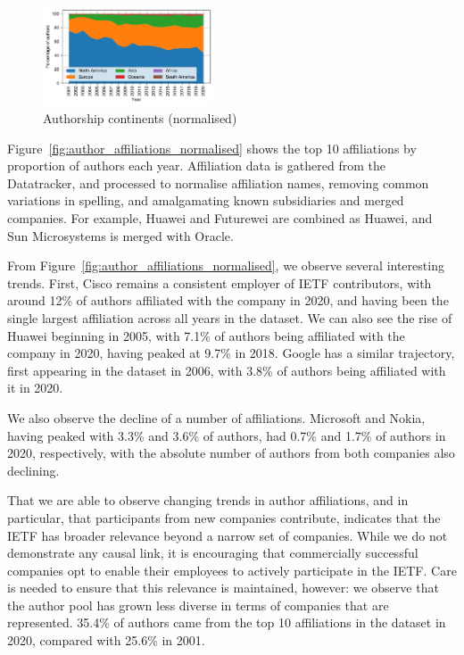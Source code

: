 \documentclass[twocolumn,10pt]{article}
\newcommand{\pb}[1]{\vspace{0.75ex}\noindent{\textbf{#1}}}
\begin{document}
\begin{figure}
\includegraphics[width=0.45\textwidth]{figures-prev/imc-2021/authors/continents_normalised.pdf}
\caption{Authorship continents (normalised)}
\label{fig:author_continents_normalised}
\end{figure}

\pb{Author Affiliations:}
Figure~\ref{fig:author_affiliations_normalised} shows the top 10
affiliations by proportion of authors each year. Affiliation data is
gathered from the Datatracker, and processed to normalise affiliation
names, removing common variations in spelling, and amalgamating known
subsidiaries and merged companies. For example, Huawei and Futurewei are
combined as Huawei, and Sun Microsystems is merged with Oracle.

From Figure~\ref{fig:author_affiliations_normalised}, we observe several
interesting trends.  First, Cisco remains a consistent employer of IETF
contributors, with around 12\% of authors affiliated with the company in
2020, and having been the single largest affiliation across all years in
the dataset. We can also see the rise of Huawei beginning in 2005, with
7.1\% of authors being affiliated with the company in 2020, having peaked
at 9.7\% in 2018. Google has a similar trajectory, first appearing in the
dataset in 2006, with 3.8\% of authors being affiliated with it in 2020.

We also observe the decline of a number of affiliations.  Microsoft and
Nokia, having peaked with 3.3\% and 3.6\% of authors, had 0.7\% and 1.7\%
of authors in 2020, respectively, with the absolute number of authors from
both companies also declining.

That we are able to observe changing trends in author affiliations, and in
particular, that participants from new companies contribute, indicates that
the IETF has broader relevance beyond a narrow set of companies. While we
do not demonstrate any causal link, it is encouraging that commercially
successful companies opt to enable their employees to actively participate
in the IETF. Care is needed to ensure that this relevance is maintained,
however: we observe that the author pool has grown less diverse in terms of
companies that are represented. 35.4\% of authors came from the top 10
affiliations in the dataset in 2020, compared with 25.6\% in 2001. 
\end{document}
